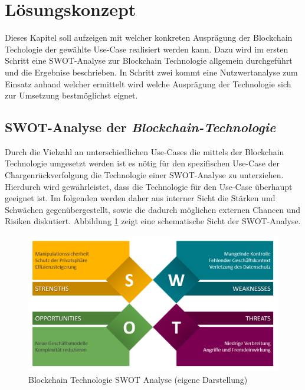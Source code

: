 \section{Lösungskonzept} \label{solution-concept}
Dieses Kapitel soll aufzeigen mit welcher konkreten Ausprägung der Blockchain Techologie der gewählte Use-Case realisiert werden kann. Dazu wird im ersten Schritt eine SWOT-Analyse zur Blockchain Technologie allgemein durchgeführt und die Ergebnise beschrieben. In Schritt zwei kommt eine Nutzwertanalyse zum Einsatz anhand welcher ermittelt wird welche Ausprägung der Technologie sich zur Umsetzung bestmöglichst eignet.

\subsection{SWOT-Analyse der \textit{Blockchain-Technologie}} \label{swot-analyse}
Durch die Vielzahl an unterschiedlichen Use-Cases die mittels der Blockchain Technologie umgesetzt werden ist es nötig für den spezifischen Use-Case der Chargenrückverfolgung die Technologie einer SWOT-Analyse zu unterziehen. Hierdurch wird gewährleistet, dass die Technologie für den Use-Case überhaupt geeignet ist. Im folgenden werden daher aus interner Sicht die Stärken und Schwächen gegenübergestellt, sowie die dadurch möglichen externen Chancen und Risiken diskutiert. Abbildung \ref{fig:blockchain-technology-swot-analysis} zeigt eine schematische Sicht der SWOT-Analyse.

\begin{figure}[H]
	\centering
	\includegraphics[width=1\linewidth]{pictures/blockchain-technology-swot-analysis}
	\caption[Blockchain Technologie SWOT Analyse]{Blockchain Technologie SWOT Analyse (eigene Darstellung)}
	\label{fig:blockchain-technology-swot-analysis}
\end{figure}


